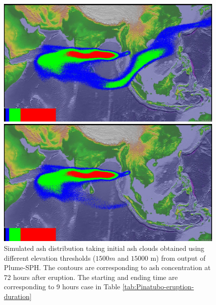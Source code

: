 \begin{figure}[!htb]
    \centering
    \begin{minipage}{.325\textwidth}
        \centering
        \includegraphics[width=0.99 \textwidth]{Chapter-7/Figures/199106180441-ash-9hr-cut1500}
    \end{minipage}%
    \begin{minipage}{.325 \textwidth}
        \centering
        \includegraphics[width=0.99 \textwidth]{Chapter-7/Figures/199106180441-ash-9hr-cut15000}
    \end{minipage}%
    \caption{Simulated ash distribution taking initial ash clouds obtained using different elevation thresholds ($1500 m$ and $15000$ m) from output of Plume-SPH. The contours are corresponding to ash concentration at 72 hours after eruption. The starting and ending time are corresponding to 9 hours case in Table \ref{tab:Pinatubo-eruption-duration}}
    \label{fig:PUFF-sensitivity-elevation-threshold}
\end{figure}

